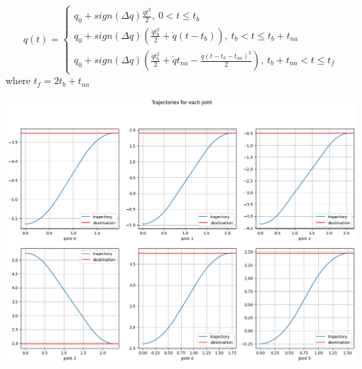 $$
q(t) = 
\begin{cases}
    q_0 + sign(\Delta q) \frac{\ddot q t^2}{2},\ 0 < t \leq t_b \\
    q_0 + sign(\Delta q) (\frac{\ddot q t_b^2}{2} + \dot q (t - t_b)),\ t_b < t \leq t_b + t_{na} \\
    q_0 + sign(\Delta q) (\frac{\ddot q t_b^2}{2} + \dot q t_{na} - \frac{\ddot q (t - t_b - t_{na})^2}{2}),\ t_b + t_{na} < t \leq t_f
\end{cases}
$$
where $t_f = 2t_b + t_{na}$

\includegraphics[width=\linewidth]{images/trajectory.png}
